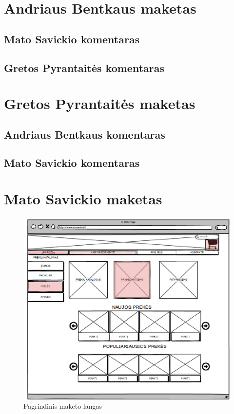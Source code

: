 \documentclass[oneside]{VUMIFPSkursinis}
\begin{document}
\section{Andriaus Bentkaus maketas}
	\subsection{Mato Savickio komentaras}
	\subsection{Gretos Pyrantaitės komentaras}

\section{Gretos Pyrantaitės maketas}
	\subsection{Andriaus Bentkaus komentaras}
	\subsection{Mato Savickio komentaras}

\section{Mato Savickio maketas}
	\begin{figure}
  		\includegraphics[width=\linewidth]{mak1.png}
  		\caption{Pagrindinis maketo langas}
 		 \label{fig:mak1}
	\end{figure}
\end{document}
